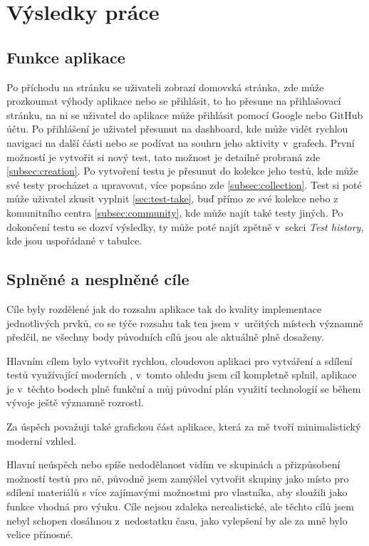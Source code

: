 \documentclass[12pt, a4paper,
openright
]{report}
\begin{document}
\chapter{Výsledky práce}
\section{Funkce aplikace}
Po příchodu na stránku se uživateli zobrazí domovská stránka, zde může prozkoumat výhody aplikace nebo se přihlásit, to ho přesune na přihlašovací stránku, na ni se uživatel do aplikace může přihlásit pomocí Google nebo GitHub účtu. Po přihlášení je uživatel přesunut na dashboard, kde může vidět rychlou navigaci na další části nebo se podívat na souhrn jeho aktivity v~grafech. První možností je vytvořit si nový test, tato možnost je detailně probraná zde \ref{subsec:creation}.
Po vytvoření testu je přesunut do kolekce jeho testů, kde může své testy procházet a upravovat, více popsáno zde \ref{subsec:collection}. Test si poté může uživatel zkusit vyplnit \ref{sec:test-take}, buď přímo ze své kolekce nebo z komunitního centra \ref{subsec:community}, kde může najít také testy jiných. Po dokončení testu se dozví výsledky, ty může poté najít zpětně v~sekci \textit{Test history}, kde jsou uspořádané v tabulce.

\section{Splněné a nesplněné cíle}
Cíle byly rozdělené jak do rozsahu aplikace tak do kvality implementace jednotlivých prvků, co se týče rozsahu tak ten jsem v~určitých místech významně předčil, ne všechny body původních cílů jsou ale aktuálně plně dosaženy.

Hlavním cílem bylo vytvořit rychlou, cloudovou aplikaci pro vytváření a sdílení testů využívající moderních , v~tomto ohledu jsem cíl kompletně splnil, aplikace je v~těchto bodech plně funkční a můj původní plán využití technologií se během vývoje ještě významně rozrostl.

Za úspěch považuji také grafickou část aplikace, která za mě tvoří minimalistický moderní vzhled.

Hlavní neúspěch nebo spíše nedodělanost vidím ve skupinách a přizpůsobení možností testů pro ně, původně jsem zamýšlel vytvořit skupiny jako místo pro sdílení materiálů s více zajímavými možnostmi pro vlastníka, aby sloužili jako funkce vhodná pro výuku. Cíle nejsou zdaleka nerealistické, ale těchto cílů jsem nebyl schopen dosáhnou z~nedostatku času, jako vylepšení by ale za mně bylo velice přínosné.
	
\end{document}

